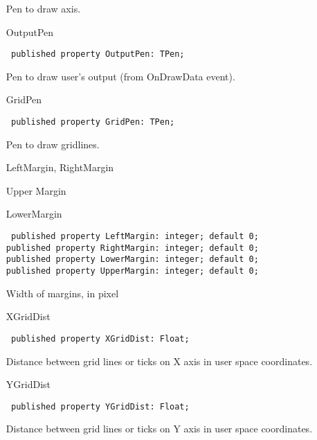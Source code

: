 \documentclass[12pt,a4paper,oneside]{report}
\newcommand{\declarationitem}[1]{{\addfontfeatures{FakeBold=1.3} #1}}
\newcommand{\code}[1]{\texttt{#1}}
\begin{document}
\begin{itemize}
\par Pen to draw axis.\label{lmcoordsys.TCoordSys-OutputPen}
\item[\declarationitem{OutputPen}\hfill]
\begin{flushleft}
\code{
published property OutputPen: TPen;}
\end{flushleft}

\par Pen to draw user's output (from OnDrawData event).\label{lmcoordsys.TCoordSys-GridPen}
\item[\declarationitem{GridPen}\hfill]
\begin{flushleft}
\code{
published property GridPen: TPen;}
\end{flushleft}

Pen to draw gridlines.
\label{lmcoordsys.TCoordSys-LeftMargin}\label{lmcoordsys.TCoordSys-RightMargin}
\item[\declarationitem{LeftMargin, RightMargin}\hfill]
\item[\declarationitem{Upper Margin}\hfill]
\item[\declarationitem{LowerMargin}\hfill]
\begin{flushleft}
\code{
published property LeftMargin: integer; default 0;\\
published property RightMargin: integer; default 0;\\
published property LowerMargin: integer; default 0;\\
published property UpperMargin: integer; default 0;}
\end{flushleft}
\par Width of margins, in pixel
\label{lmcoordsys.TCoordSys-XGridDist}
\item[\declarationitem{XGridDist}\hfill]
\begin{flushleft}
\code{
published property XGridDist: Float;}
\end{flushleft}
Distance between grid lines or ticks on X axis in user space coordinates. \label{lmcoordsys.TCoordSys-YGridDist}
\item[\declarationitem{YGridDist}\hfill]
\begin{flushleft}
\code{
published property YGridDist: Float;}
\end{flushleft}
Distance between grid lines or ticks on Y axis in user space coordinates. 


\end{itemize}
\end{document}
